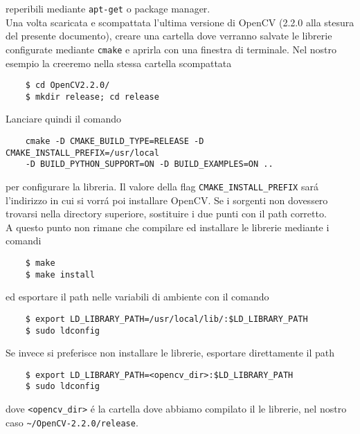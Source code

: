 \documentclass[12pt]{article}
\begin{document}
\noindent reperibili mediante \verb|apt-get| o package manager.\\

\noindent Una volta scaricata e scompattata l'ultima versione di OpenCV (2.2.0 alla stesura del presente documento), creare una cartella dove verranno salvate le librerie configurate mediante \verb|cmake| e aprirla con una finestra di terminale. Nel nostro esempio la creeremo nella stessa cartella scompattata

\begin{verbatim}
	$ cd OpenCV2.2.0/
	$ mkdir release; cd release
\end{verbatim}

\noindent Lanciare quindi il comando

\begin{verbatim}
	cmake -D CMAKE_BUILD_TYPE=RELEASE -D CMAKE_INSTALL_PREFIX=/usr/local
	-D BUILD_PYTHON_SUPPORT=ON -D BUILD_EXAMPLES=ON ..
\end{verbatim}

\noindent per configurare la libreria. Il valore della flag \verb|CMAKE_INSTALL_PREFIX| sar\'a l'indirizzo in cui si vorr\'a poi installare OpenCV. Se i sorgenti non dovessero trovarsi nella directory superiore, sostituire i due punti con il path corretto.\\

\noindent A questo punto non rimane che compilare ed installare le librerie mediante i comandi

\begin{verbatim}
	$ make
	$ make install
\end{verbatim}

\noindent ed esportare il path nelle variabili di ambiente con il comando

\begin{verbatim}
	$ export LD_LIBRARY_PATH=/usr/local/lib/:$LD_LIBRARY_PATH
	$ sudo ldconfig
\end{verbatim}

\noindent Se invece si preferisce non installare le librerie, esportare direttamente il path 

\begin{verbatim}
	$ export LD_LIBRARY_PATH=<opencv_dir>:$LD_LIBRARY_PATH
	$ sudo ldconfig
\end{verbatim}

\noindent dove \verb|<opencv_dir>| \'e la cartella dove abbiamo compilato il le librerie, nel nostro caso \verb|~/OpenCV-2.2.0/release|.
\end{document}
